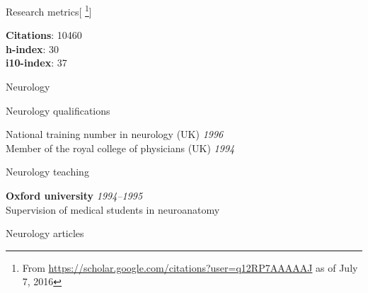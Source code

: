 \documentclass{cv}
\newcommand{\PlaceDateNote}[3]{{\bf #1} \hfill {\em #2} \\#3}
\begin{document}
\begin{cvSection}{Research metrics}[
    \footnote{ From
    \url{https://scholar.google.com/citations?user=q12RP7AAAAAJ} as of July 7,
2016}]

{\bf Citations}: 10460 \\
{\bf h-index}: 30 \\
{\bf i10-index}: 37

\end{cvSection}

\begin{cvSection}{Neurology}

\begin{cvSubSection}{Neurology qualifications}

National training number in neurology (UK) \hfill {\em 1996} \\
Member of the royal college of physicians (UK) \hfill {\em 1994}

\end{cvSubSection}

\begin{cvSubSection}{Neurology teaching}

\PlaceDateNote{Oxford university}{1994--1995}{
Supervision of medical students in neuroanatomy}

\end{cvSubSection}

\begin{cvSubSection}{Neurology articles}

\printbibliography[heading=none,
    keyword=neurology,
notkeyword=omit]

\end{cvSubSection}

\end{cvSection}
\end{document}
